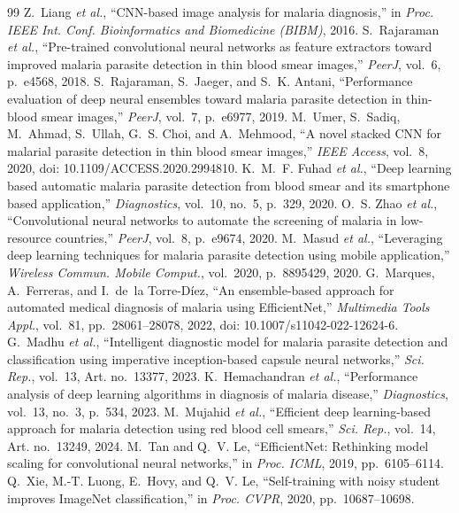 \documentclass[conference]{IEEEtran}
\begin{document}
\begin{thebibliography}{99}
 Z.~Liang \emph{et al.}, ``CNN-based image analysis for malaria diagnosis,'' in \emph{Proc. IEEE Int. Conf. Bioinformatics and Biomedicine (BIBM)}, 2016.
 S.~Rajaraman \emph{et al.}, ``Pre-trained convolutional neural networks as feature extractors toward improved malaria parasite detection in thin blood smear images,'' \emph{PeerJ}, vol.~6, p.~e4568, 2018.
 S.~Rajaraman, S.~Jaeger, and S.~K. Antani, ``Performance evaluation of deep neural ensembles toward malaria parasite detection in thin-blood smear images,'' \emph{PeerJ}, vol.~7, p.~e6977, 2019.
 M.~Umer, S.~Sadiq, M.~Ahmad, S.~Ullah, G.~S. Choi, and A.~Mehmood, ``A novel stacked CNN for malarial parasite detection in thin blood smear images,'' \emph{IEEE Access}, vol.~8, 2020, doi: 10.1109/ACCESS.2020.2994810.
 K.~M.~F. Fuhad \emph{et al.}, ``Deep learning based automatic malaria parasite detection from blood smear and its smartphone based application,'' \emph{Diagnostics}, vol.~10, no.~5, p.~329, 2020.
 O.~S. Zhao \emph{et al.}, ``Convolutional neural networks to automate the screening of malaria in low-resource countries,'' \emph{PeerJ}, vol.~8, p.~e9674, 2020.
 M.~Masud \emph{et al.}, ``Leveraging deep learning techniques for malaria parasite detection using mobile application,'' \emph{Wireless Commun. Mobile Comput.}, vol.~2020, p.~8895429, 2020.
 G.~Marques, A.~Ferreras, and I.~de~la Torre-D\'iez, ``An ensemble-based approach for automated medical diagnosis of malaria using EfficientNet,'' \emph{Multimedia Tools Appl.}, vol.~81, pp.~28061--28078, 2022, doi: 10.1007/s11042-022-12624-6.
 G.~Madhu \emph{et al.}, ``Intelligent diagnostic model for malaria parasite detection and classification using imperative inception-based capsule neural networks,'' \emph{Sci. Rep.}, vol.~13, Art. no.~13377, 2023.
 K.~Hemachandran \emph{et al.}, ``Performance analysis of deep learning algorithms in diagnosis of malaria disease,'' \emph{Diagnostics}, vol.~13, no.~3, p.~534, 2023.
 M.~Mujahid \emph{et al.}, ``Efficient deep learning-based approach for malaria detection using red blood cell smears,'' \emph{Sci. Rep.}, vol.~14, Art. no.~13249, 2024.
 M.~Tan and Q.~V. Le, ``EfficientNet: Rethinking model scaling for convolutional neural networks,'' in \emph{Proc. ICML}, 2019, pp.~6105--6114.
 Q.~Xie, M.-T. Luong, E.~Hovy, and Q.~V. Le, ``Self-training with noisy student improves ImageNet classification,'' in \emph{Proc. CVPR}, 2020, pp.~10687--10698.

\end{thebibliography}
\end{document}
